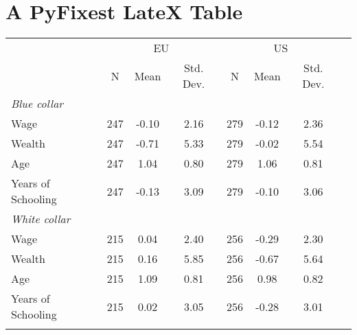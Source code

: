 \documentclass{article}%
\begin{document}
%
\normalsize%
\section{A PyFixest LateX Table}%
\label{sec:APyFixestLateXTable}%


\begin{table}[htbp]%
\renewcommand\cellalign{t}
\begin{threeparttable}
\begin{tabular}{lccccccc}
\toprule
 & \multicolumn{3}{c}{EU} & \multicolumn{3}{c}{US} \\
\cmidrule(lr){2-4} \cmidrule(lr){5-7} 
 & N & Mean & Std. Dev. & N & Mean & Std. Dev. \\
\midrule
\addlinespace
\emph{Blue collar} \\
\addlinespace
Wage & 247 & -0.10 & 2.16 & 279 & -0.12 & 2.36 \\
Wealth & 247 & -0.71 & 5.33 & 279 & -0.02 & 5.54 \\
Age & 247 & 1.04 & 0.80 & 279 & 1.06 & 0.81 \\
Years of Schooling & 247 & -0.13 & 3.09 & 279 & -0.10 & 3.06 \\
\addlinespace
\midrule
\addlinespace
\emph{White collar} \\
\addlinespace
Wage & 215 & 0.04 & 2.40 & 256 & -0.29 & 2.30 \\
Wealth & 215 & 0.16 & 5.85 & 256 & -0.67 & 5.64 \\
Age & 215 & 1.09 & 0.81 & 256 & 0.98 & 0.82 \\
Years of Schooling & 215 & 0.02 & 3.05 & 256 & -0.28 & 3.01 \\
\addlinespace
\bottomrule
\end{tabular}
\footnotesize 
\end{threeparttable}%
\end{table}

%
\end{document}
